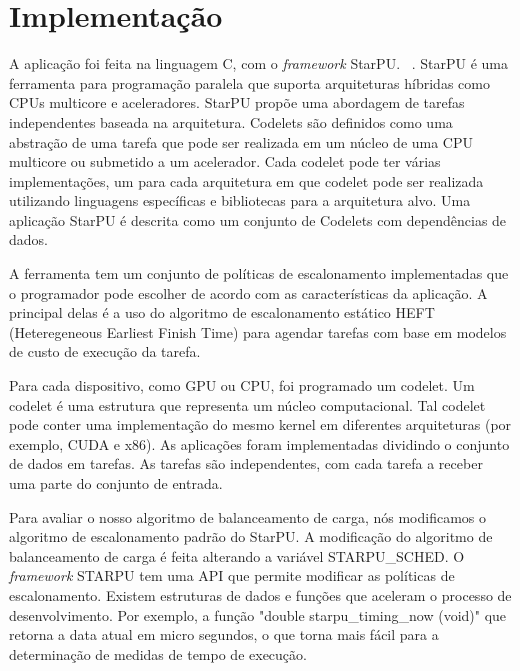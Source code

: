 \pagestyle{empty}
\cleardoublepage
\pagestyle{fancy}

\chapter{Implementação}\label{cap5}


A aplicação foi feita na linguagem C, com o \emph{framework} StarPU. ~\cite{starpu}. StarPU  é uma ferramenta para programação paralela que suporta 
arquiteturas híbridas como CPUs multicore e aceleradores.  StarPU propõe 
uma abordagem de tarefas independentes baseada na arquitetura. Codelets são definidos como uma  abstração de uma tarefa que pode ser realizada em um núcleo de uma CPU multicore ou 
submetido a um acelerador. Cada codelet pode ter várias implementações, um 
para cada arquitetura em que codelet pode ser realizada utilizando linguagens específicas 
e bibliotecas para a arquitetura alvo. Uma aplicação StarPU é descrita como  
um conjunto de Codelets com dependências de dados. 

A ferramenta tem um conjunto de políticas de escalonamento implementadas que o programador pode 
escolher de acordo com as características da aplicação. A principal delas é a 
uso do algoritmo de escalonamento estático HEFT (Heteregeneous Earliest Finish Time) para 
agendar tarefas com base em modelos de custo de execução da tarefa. 

Para cada dispositivo, como GPU ou CPU, foi programado um codelet. Um codelet é uma estrutura que representa um núcleo computacional. Tal codelet pode conter uma implementação do mesmo kernel em diferentes  arquiteturas (por exemplo, CUDA e x86). As aplicações foram implementadas  dividindo o conjunto de dados em tarefas. As tarefas são  independentes, com cada tarefa a receber uma parte do conjunto de entrada. 

Para avaliar o nosso algoritmo de balanceamento de carga, nós modificamos o algoritmo de escalonamento padrão do StarPU. A modificação do algoritmo de balanceamento de carga é feita alterando a variável STARPU\_SCHED. O \emph{framework} STARPU tem uma API que permite modificar as políticas de escalonamento. Existem estruturas de dados e funções que aceleram o processo de desenvolvimento. Por exemplo, a função "double starpu\_timing\_now (void)" que retorna a data atual em micro segundos, o que torna mais fácil para a determinação de medidas de tempo de execução. 

